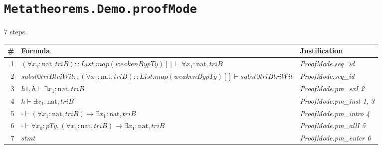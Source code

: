 \section*{\texttt{Metatheorems.Demo.proofMode}}
7 steps.

\begin{longtable}{r l l}
\hline
\# & Formula & Justification \\
\hline
\endhead
1 & $(\forall  x_{1} : \mathrm{nat}, triB) :: List.map (weakenBy pTy) []  \vdash  \forall  x_{1} : \mathrm{nat}, triB$ & \textit{ProofMode.seq\_id} \\
2 & $subst0 triB triWit :: (\forall  x_{1} : \mathrm{nat}, triB) :: List.map (weakenBy pTy) []  \vdash  subst0 triB triWit$ & \textit{ProofMode.seq\_id} \\
3 & $h1, h  \vdash  \exists  x_{1} : \mathrm{nat}, triB$ & \textit{ProofMode.pm\_exI 2} \\
4 & $h  \vdash  \exists  x_{1} : \mathrm{nat}, triB$ & \textit{ProofMode.pm\_inst 1, 3} \\
5 & $\cdot  \vdash  (\forall  x_{1} : \mathrm{nat}, triB)  \to  \exists  x_{1} : \mathrm{nat}, triB$ & \textit{ProofMode.pm\_intro 4} \\
6 & $\cdot  \vdash  \forall  x_{0} : pTy, (\forall  x_{1} : \mathrm{nat}, triB)  \to  \exists  x_{1} : \mathrm{nat}, triB$ & \textit{ProofMode.pm\_allI 5} \\
7 & $stmt$ & \textit{ProofMode.pm\_enter 6} \\
\hline
\end{longtable}
